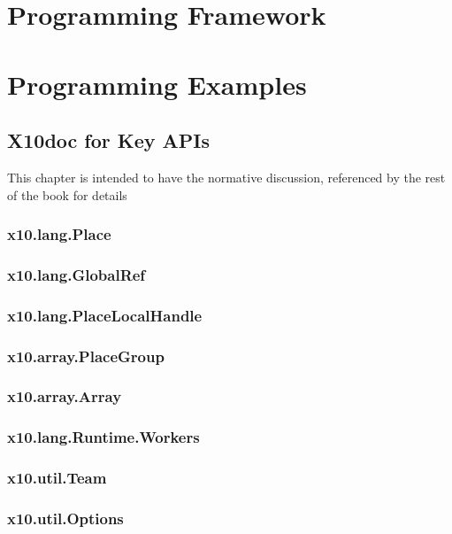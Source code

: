 \documentclass[10pt,twoside,notitlepage]{book}
\begin{document}
\frontmatter
 
\addtolength{\cftsecnumwidth}{0.5em}
\addtolength{\cftsubsecnumwidth}{0.5em}
\addtolength{\cftsecindent}{0.5em}


\clearpage
\tableofcontents

\mainmatter

\part{Programming Framework}




\part{Programming Examples}









\renewcommand{\bibname}{References}



\appendix
\chapter{X10doc for Key APIs}
This chapter is intended to have the normative discussion, referenced
by the rest of the book for details
\section{x10.lang.Place}
\section{x10.lang.GlobalRef}
\section{x10.lang.PlaceLocalHandle}
\section{x10.array.PlaceGroup}
\section{x10.array.Array}
\section{x10.lang.Runtime.Workers}
\section{x10.util.Team}
\section{x10.util.Options}


\end{document}
